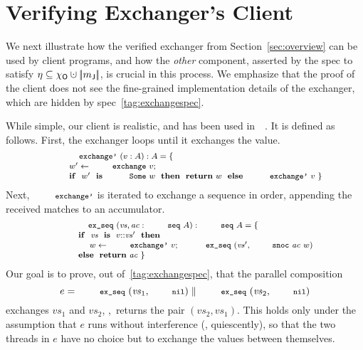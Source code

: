 \section{Verifying Exchanger's Client}
\label{sec:cal}
\newcommand{\ts}{\mathit{ts}}
\newcommand{\vvs}{\mathit{vs}}
\newcommand{\acc}{\mathit{ac}}
\newcommand{\ws}{\mathit{ws}}
\newcommand{\sorted}[1]{\mathsf{sorted}\ #1}

We next illustrate how the verified exchanger from
Section~\ref{sec:overview} can be used by client programs, and how the
\emph{other} component, asserted by the spec to satisfy $\gist
\subseteq \histo \hunion \mygather{\pending}$, is crucial in this
process.
%
We emphasize that the proof of the client does not see the
fine-grained implementation details of the exchanger, which are hidden
by spec~\eqref{tag:exchangespec}.
%

While simple, our client is realistic, and has been used
in~~\cite{ExchangerClass}. It is defined as
follows. First, the exchanger loops until it exchanges the value.
%
\vspace{-2pt}
\[
\vspace{-2pt}
{\small{
\begin{array}{rl}
& \esc{exchange'}~(v : A) : A = \{\\[1pt]
&  ~~~~ w' \Asgn \esc{exchange}~v;\\[1pt]
&  ~~~~
  \kw{if}~~w'~~\kw{is}~~\esc{Some}~w~~\kw{then}~~\kw{return}~w~~\kw{else}~~\esc{exchange'}~v~\}
\end{array}
}}
\]
%
Next, $\esc{exchange'}$ is iterated to exchange a sequence in order,
appending the received matches to an accumulator.
%
\[
{\small{
\begin{array}{rl}
& \esc{ex\_seq}~(\vvs, \acc : \esc{seq}~A) : \esc{seq}~A = \{\\[1pt]
& ~~~~ \kw{if}~~\vvs~~\kw{is}~~v{::}\vvs'~~\kw{then}\\[1pt]
& ~~~~ ~~~~ w \Asgn \esc{exchange'}~v;~~\esc{ex\_seq}~(\vvs', \esc{snoc}~\acc~w)\\[1pt]
& ~~~~ \kw{else}~~\kw{return}~\acc~\}
\end{array}
}}
\]
%
Our goal is to prove, out of~\eqref{tag:exchangespec},
that the parallel composition
%
\[
e = \esc{ex\_seq}~(\vvs_1, \esc{nil}) \parallel \esc{ex\_seq}~(\vvs_2, \esc{nil})
\]
%
exchanges $\vvs_1$ and $\vvs_2$, \ie,~returns the pair $(\vvs_2,
\vvs_1)$. This holds only under the assumption that $e$ runs without
interference (\ie, quiescently), so that the two threads in $e$ have
no choice but to exchange the values between themselves. 

